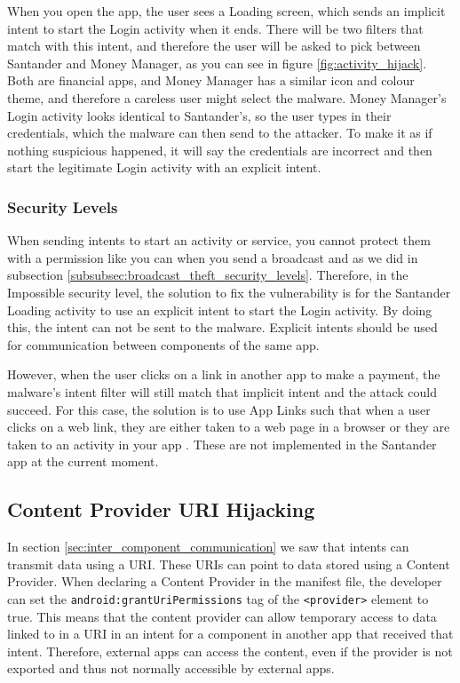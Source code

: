     When you open the app, the user sees a Loading screen, which sends an implicit intent to start the Login activity when it ends. There will be two filters that match with this intent, and therefore the user will be asked to pick between Santander and Money Manager, as you can see in figure \ref{fig:activity_hijack}. Both are financial apps, and Money Manager has a similar icon and colour theme, and therefore a careless user might select the malware. Money Manager's Login activity looks identical to Santander's, so the user types in their credentials, which the malware can then send to the attacker. To make it as if nothing suspicious happened, it will say the credentials are incorrect and then start the legitimate Login activity with an explicit intent.
    
    \subsubsection{Security Levels}
        \label{subsubsec:activity_hijack_security_levels}
        
    When sending intents to start an activity or service, you cannot protect them with a permission like you can when you send a broadcast and as we did in subsection \ref{subsubsec:broadcast_theft_security_levels}. Therefore, in the Impossible security level, the solution to fix the vulnerability is for the Santander Loading activity to use an explicit intent to start the Login activity. By doing this, the intent can not be sent to the malware. Explicit intents should be used for communication between components of the same app.

    However, when the user clicks on a link in another app to make a payment, the malware's intent filter will still match that implicit intent and the attack could succeed. For this case, the solution is to use App Links such that when a user clicks on a web link, they are either taken to a web page in a browser or they are taken to an activity in your app \cite{android_app_links}. These are not implemented in the Santander app at the current moment.
    
    \subsection{Content Provider URI Hijacking}
        \label{subsec:provider_uri_hijacking}
        
   In section \ref{sec:inter_component_communication} we saw that intents can transmit data using a URI. These URIs can point to data stored using a Content Provider. When declaring a Content Provider in the manifest file, the developer can set the \lstinline|android:grantUriPermissions| tag of the \lstinline|<provider>| element to true. This means that the content provider can allow temporary access to data linked to in a URI in an intent for a component in another app that received that intent. Therefore, external apps can access the content, even if the provider is not exported and thus not normally accessible by external apps.
    
